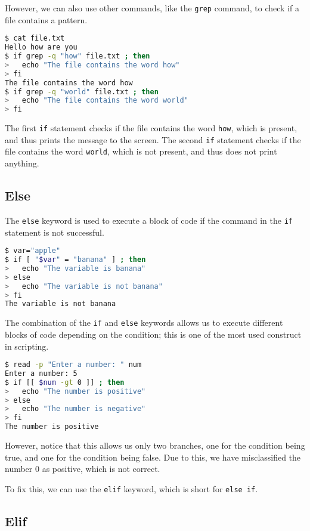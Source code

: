 However, we can also use other commands, like the \lstinline{grep} command, to check if a file contains a pattern.

\begin{lstlisting}[language=bash]
$ cat file.txt
Hello how are you
$ if grep -q "how" file.txt ; then
>   echo "The file contains the word how"
> fi
The file contains the word how
$ if grep -q "world" file.txt ; then
>   echo "The file contains the word world"
> fi
\end{lstlisting}

The first \lstinline{if} statement checks if the file contains the word \lstinline{how}, which is present, and thus prints the message to the screen.
The second \lstinline{if} statement checks if the file contains the word \lstinline{world}, which is not present, and thus does not print anything.

\subsection{Else}

The \lstinline{else} keyword is used to execute a block of code if the command in the \lstinline{if} statement is not successful.

\begin{lstlisting}[language=bash]
$ var="apple"
$ if [ "$var" = "banana" ] ; then
>   echo "The variable is banana"
> else
>   echo "The variable is not banana"
> fi
The variable is not banana
\end{lstlisting}

The combination of the \lstinline{if} and \lstinline{else} keywords allows us to execute different blocks of code depending on the condition; this is one of the most used construct in scripting.

\begin{lstlisting}[language=bash]
$ read -p "Enter a number: " num
Enter a number: 5
$ if [[ $num -gt 0 ]] ; then
>   echo "The number is positive"
> else
>   echo "The number is negative"
> fi
The number is positive
\end{lstlisting}

However, notice that this allows us only two branches, one for the condition being true, and one for the condition being false.
Due to this, we have misclassified the number 0 as positive, which is not correct.

To fix this, we can use the \lstinline{elif} keyword, which is short for \lstinline{else if}.

\subsection{Elif}

